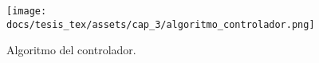
\begin{figure}[!ht]
    \centering
    \texttt{[image: docs/tesis\_tex/assets/cap\_3/algoritmo\_controlador.png]}
    \caption{Algoritmo del controlador.}
    \label{fig:algoritmo_controlador}
\end{figure}